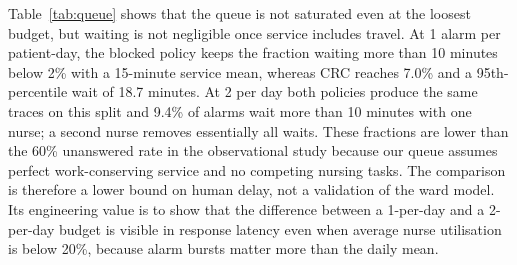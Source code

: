 Table~\ref{tab:queue} shows that the queue is not saturated even at the loosest budget, but waiting is not negligible once service includes travel. At 1 alarm per patient-day, the blocked policy keeps the fraction waiting more than 10 minutes below 2\% with a 15-minute service mean, whereas CRC reaches 7.0\% and a 95th-percentile wait of 18.7 minutes. At 2 per day both policies produce the same traces on this split and 9.4\% of alarms wait more than 10 minutes with one nurse; a second nurse removes essentially all waits. These fractions are lower than the 60\% unanswered rate in the observational study because our queue assumes perfect work-conserving service and no competing nursing tasks. The comparison is therefore a lower bound on human delay, not a validation of the ward model. Its engineering value is to show that the difference between a 1-per-day and a 2-per-day budget is visible in response latency even when average nurse utilisation is below 20\%, because alarm bursts matter more than the daily mean.

